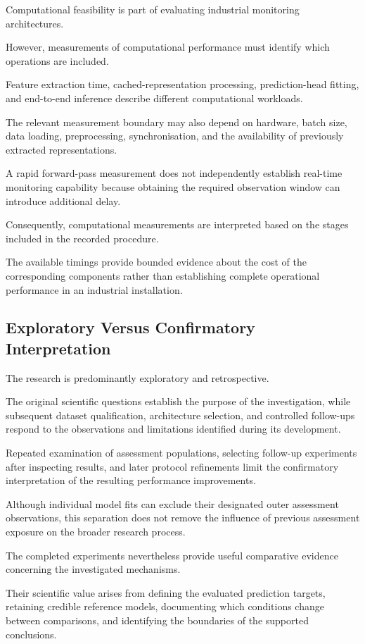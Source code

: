 Computational feasibility is part of evaluating industrial monitoring architectures.

However, measurements of computational performance must identify which operations are included.

Feature extraction time, cached-representation processing, prediction-head fitting, and end-to-end inference describe different computational workloads.

The relevant measurement boundary may also depend on hardware, batch size, data loading, preprocessing, synchronisation, and the availability of previously extracted representations.

A rapid forward-pass measurement does not independently establish real-time monitoring capability because obtaining the required observation window can introduce additional delay.

Consequently, computational measurements are interpreted based on the stages included in the recorded procedure.

The available timings provide bounded evidence about the cost of the corresponding components rather than establishing complete operational performance in an industrial installation.

\subsection{Exploratory Versus Confirmatory Interpretation}

The research is predominantly exploratory and retrospective.

The original scientific questions establish the purpose of the investigation, while subsequent dataset qualification, architecture selection, and controlled follow-ups respond to the observations and limitations identified during its development.

Repeated examination of assessment populations, selecting follow-up experiments after inspecting results, and later protocol refinements limit the confirmatory interpretation of the resulting performance improvements.

Although individual model fits can exclude their designated outer assessment observations, this separation does not remove the influence of previous assessment exposure on the broader research process.

The completed experiments nevertheless provide useful comparative evidence concerning the investigated mechanisms.

Their scientific value arises from defining the evaluated prediction targets, retaining credible reference models, documenting which conditions change between comparisons, and identifying the boundaries of the supported conclusions.

